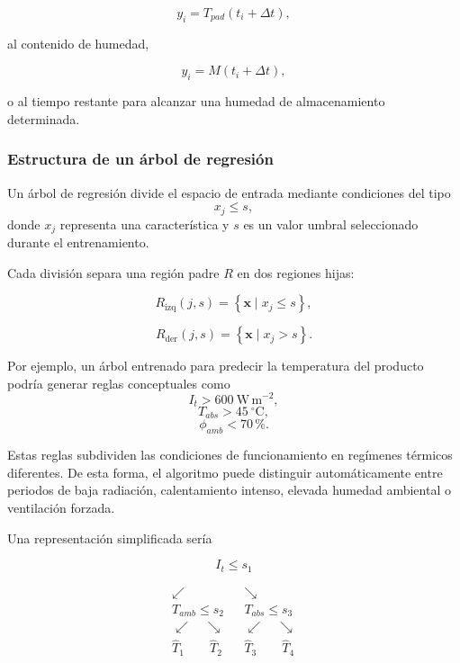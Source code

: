 \begin{equation}
y_i
=
T_{pad}(t_i+\Delta t),
\end{equation}

al contenido de humedad,

\begin{equation}
y_i=M(t_i+\Delta t),
\end{equation}

o al tiempo restante para alcanzar una humedad de almacenamiento determinada.

\subsubsection{Estructura de un árbol de regresión}

Un árbol de regresión divide el espacio de entrada mediante condiciones del tipo
\begin{equation}
x_j\leq s,
\end{equation}
donde $x_j$ representa una característica y $s$ es un valor umbral seleccionado durante el entrenamiento.

Cada división separa una región padre $R$ en dos regiones hijas:

\begin{equation}
R_{\mathrm{izq}}(j,s)
=
\left\{
\mathbf{x}\mid x_j\leq s
\right\},
\end{equation}

\begin{equation}
R_{\mathrm{der}}(j,s)
=
\left\{
\mathbf{x}\mid x_j>s
\right\}.
\end{equation}

Por ejemplo, un árbol entrenado para predecir la temperatura del producto podría generar reglas conceptuales como
\[
I_t>600~\mathrm{W\,m^{-2}},
\]
\[
T_{abs}>45~^{\circ}\mathrm{C},
\]
\[
\phi_{amb}<70\,\%.
\]

Estas reglas subdividen las condiciones de funcionamiento en regímenes térmicos diferentes. De esta forma, el algoritmo puede distinguir automáticamente entre periodos de baja radiación, calentamiento intenso, elevada humedad ambiental o ventilación forzada.

Una representación simplificada sería

\begin{center}
\begin{minipage}{0.82\linewidth}
\centering
\[
\boxed{I_t\leq s_1}
\]

\[
\begin{array}{ccc}
\swarrow && \searrow\\[-0.15cm]
T_{amb}\leq s_2 && T_{abs}\leq s_3\\
\swarrow\quad\searrow && \swarrow\quad\searrow\\
\hat{T}_1\qquad\hat{T}_2 &&
\hat{T}_3\qquad\hat{T}_4
\end{array}
\]
\end{minipage}
\end{center}

